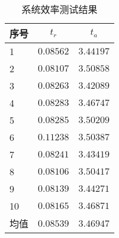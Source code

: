 
\begin{table}[H]
  \setlength{\tabcolsep}{25pt}
  \centering
  \begin{tabular}{ l c c }
    \hline
    序号 & $t_r$ & $t_a$ \\ \hline \hline
    1 & $0.08562$ & $3.44197$ \\
    2 & $0.08107$ & $3.50858$ \\
    3 & $0.08263$ & $3.42089$ \\
    4 & $0.08283$ & $3.46747$ \\
    5 & $0.08285$ & $3.50209$ \\
    6 & $0.11238$ & $3.50387$ \\
    7 & $0.08241$ & $3.43419$ \\
    8 & $0.08106$ & $3.50417$ \\
    9 & $0.08139$ & $3.44271$ \\
    10 & $0.08165$ & $3.46871$ \\
    均值 & $0.08539$ & $3.46947$ \\
    \hline
  \end{tabular}
  \caption{系统效率测试结果}
  \label{tab:sys-retrieval-effi}
\end{table}

